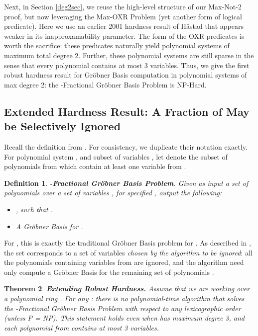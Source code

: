 \documentclass{article}
\newtheorem{theorem}{Theorem}[]
\newtheorem{definition}[theorem]{Definition}
\begin{document}
Next, in Section \ref{deg2sec}, we reuse the high-level structure of our Max-Not-2 proof, but now leveraging the Max-OXR Problem (yet another form of logical predicate). Here we use an earlier 2001 hardness result of H{\aa}stad that appears weaker in its inapproxamability parameter. The form of the OXR predicates is worth the sacrifice: these predicates naturally yield polynomial systems of maximum total degree 2. Further, these polynomial systems are still sparse in the sense that every polynomial contains at most 3 variables. Thus, we give the first robust hardness result for Gr\"{o}bner Basis computation in polynomial systems of max degree 2: the -Fractional Gr\"{o}bner Basis Problem is NP-Hard. 



\subsection{Extended Hardness Result: A  Fraction of  May be Selectively Ignored} \label{not2sec}

Recall the definition from \citep{RS}. For consistency, we duplicate their notation exactly. For polynomial system , and subset of variables , let  denote the subset of polynomials from  which contain at least one variable from .

\begin{definition}
\textbf{-Fractional Gr\"{o}bner Basis Problem}. Given as input a set of polynomials  over a set of variables , for specified , output the following:
\begin{itemize}
\item , such that .
\item A Gr\"{o}bner Basis for .
\end{itemize}
\end{definition}

\noindent For , this is exactly the traditional Gr\"{o}bner Basis problem for . As described in \citep {RS}, the set  corresponds to a set of variables \textit{chosen by the algorithm to be ignored}: all the polynomials containing variables from  are ignored, and the algorithm need only compute a Gr\"{o}bner Basis for the remaining set of polynomials .

\begin{theorem} \textbf{Extending Robust Hardness.} \label{extfrachard}
Assume that we are working over a polynomial ring . For any : there is no polynomial-time algorithm  that solves the -Fractional Gr\"{o}bner Basis Problem with respect to any lexicographic order (unless P = NP). This statement holds even when  has maximum degree 3, and each polynomial from  contains at most 3 variables.
\end{theorem}
\end{document}
